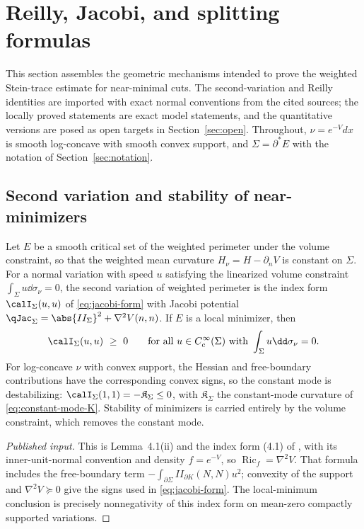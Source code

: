 \documentclass[../../main.tex]{subfiles}
\begin{document}
\section{Reilly, Jacobi, and splitting formulas}
\label{sec:jacobi}

This section assembles the geometric mechanisms intended to prove the weighted Stein-trace
estimate for near-minimal cuts. The second-variation and Reilly identities are imported with exact
normal conventions from the cited sources; the locally proved statements are exact model
statements, and the quantitative versions are posed as open targets in
Section~\ref{sec:open}. Throughout, $\nu=e^{-V}dx$ is smooth log-concave with smooth convex
support, and $\Sigma=\partial^*E$ with the notation of Section~\ref{sec:notation}.

\subsection{Second variation and stability of near-minimizers}

\begin{proposition}
\label{prop:second-variation}
Let $E$ be a smooth critical set of the weighted perimeter under the volume constraint, so
that the weighted mean curvature $H_\nu=H-\partial_nV$ is constant on $\Sigma$. For a normal
variation with speed $u$ satisfying the linearized volume constraint
$\int_\Sigma u\dd\sigma_\nu=0$, the second variation of weighted perimeter is the index form
$\calI_\Sigma(u,u)$ of \eqref{eq:jacobi-form} with Jacobi potential
$\qJac_\Sigma=\abs{II_\Sigma}^2+\nabla^2V(n,n)$. If $E$ is a local minimizer, then
\begin{equation}\label{eq:stability}
  \calI_\Sigma(u,u)\ \ge\ 0
  \qquad\text{for all }u\in C_c^\infty(\Sigma)\text{ with }\int_\Sigma u\dd\sigma_\nu=0 .
\end{equation}
For log-concave $\nu$ with convex support, the Hessian and free-boundary contributions have the
corresponding convex signs, so the constant mode is destabilizing:
$\calI_\Sigma(1,1)=-\mathfrak K_\Sigma\le0$, with $\mathfrak K_\Sigma$
the constant-mode curvature of \eqref{eq:constant-mode-K}. Stability of minimizers is carried
entirely by the volume constraint, which removes the constant mode.
\end{proposition}

\begin{proof}[Published input]
This is Lemma~4.1(ii) and the index form (4.1) of \cite{Rosales2014}, with its inner-unit-normal
convention and density $f=e^{-V}$, so $\operatorname{Ric}_f=\nabla^2V$. That formula includes the
free-boundary term $-\int_{\partial\Sigma}II_{\partial K}(N,N)u^2$; convexity of the support and
$\nabla^2V\succeq0$ give the signs used in \eqref{eq:jacobi-form}. The local-minimum conclusion
is precisely nonnegativity of this index form on mean-zero compactly supported variations.
\end{proof}
\end{document}
